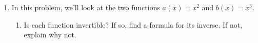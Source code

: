 \documentclass{article}
\begin{document}
\begin{enumerate}
\begin{solution}
    If multiple inputs of a function $f$ correspond to the same output, we say that the 
    function $f$ is not \emph{invertible}. A function is invertible if every output
    corresponds with exactly one input. Graphically, a function is invertible
    if it passes the horizontal line test: no horizontal line intersects the graph more
    than once.
    
  \end{solution}

\item  In this problem, we'll look at the two functions $a(x) = x^2$
  and $b(x) = x^3$. 

  \begin{enumerate}
  \item
    \begin{problem}[2in]      
      Is each function invertible? If so, find a formula for its
      inverse. If not, explain why not. 
    \end{problem}


\end{enumerate}
\end{enumerate}
\end{document}
